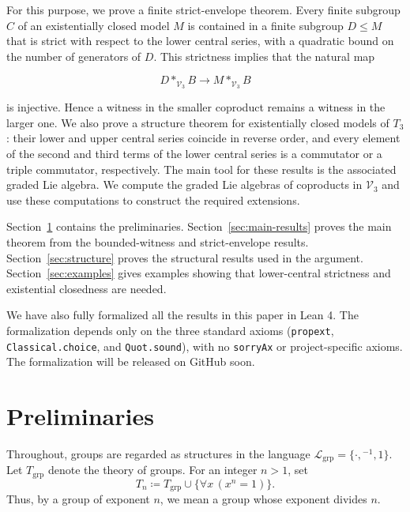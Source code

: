 \documentclass[11pt,reqno]{article}
\theoremstyle{definition}
\theoremstyle{remark}
\begin{document}
For this purpose, we prove a finite strict-envelope theorem.
Every finite subgroup $C$ of an existentially closed model $M$ is contained in a finite subgroup $D\leq M$ that is strict with respect to the lower central series, with a quadratic bound on the number of generators of $D$.
This strictness implies that the natural map 

\[ D*_{\mathcal V_3}B\longrightarrow M*_{\mathcal V_3}B \]

is injective.
Hence a witness in the smaller coproduct remains a witness in the larger one.
We also prove a structure theorem for existentially closed models of $T_3$: their lower and upper central series coincide in reverse order, and every element of the second and third terms of the lower central series is a commutator or a triple commutator, respectively.
The main tool for these results is the associated graded Lie algebra.
We compute the graded Lie algebras of coproducts in $\mathcal V_3$ and use these computations to construct the required extensions.

Section~\ref{sec:preliminaries} contains the preliminaries.
Section~\ref{sec:main-results} proves the main theorem from the bounded-witness and strict-envelope results.
Section~\ref{sec:structure} proves the structural results used in the argument.
Section~\ref{sec:examples} gives examples showing that lower-central strictness and existential closedness are needed.

We have also fully formalized all the results in this paper in Lean 4.
The formalization depends only on the three standard axioms
(\texttt{propext}, \texttt{Classical.choice}, and \texttt{Quot.sound}),
with no \texttt{sorryAx} or project-specific axioms.
The formalization will be released on GitHub soon.

\section{Preliminaries}
\label{sec:preliminaries}

Throughout, groups are regarded as structures in the language
$\mathcal{L}_{\mathrm{grp}}=\{\cdot,{}^{-1},1\}$.  Let
$T_{\mathrm{grp}}$ denote the theory of groups.  For an integer $n>1$, set
\[
T_n \coloneqq T_{\mathrm{grp}} \cup \{\forall x\,(x^n=1)\}.
\]
Thus, by a group of exponent $n$, we mean a group whose exponent divides $n$.
\end{document}

